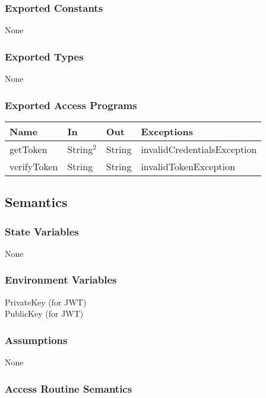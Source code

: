 \documentclass[12pt, titlepage]{article}
\begin{document}
\subsubsection{Exported Constants}

None

\subsubsection{Exported Types}

None

\subsubsection{Exported Access Programs}

\begin{center}
\begin{tabular}{p{5cm} p{3cm} p{3cm} p{5cm}}
\hline
\textbf{Name} & \textbf{In} & \textbf{Out} & \textbf{Exceptions} \\
\hline
getToken & String$^2$ & String & invalidCredentialsException \\
verifyToken & String & String & invalidTokenException \\
\hline
\end{tabular}
\end{center}

\subsection{Semantics}

\subsubsection{State Variables}
None

\subsubsection{Environment Variables}
PrivateKey (for JWT) \\
PublicKey (for JWT)

\subsubsection{Assumptions}
None

\subsubsection{Access Routine Semantics}
\end{document}
